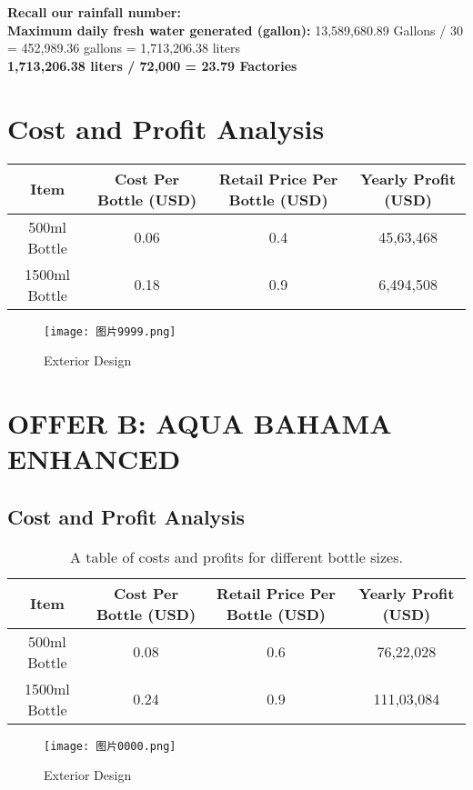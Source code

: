 \documentclass{article}
\begin{document}
\textbf{Recall our rainfall number:} \\
\textbf{Maximum daily fresh water generated (gallon):} 13,589,680.89 Gallons / 30 = 452,989.36 gallons = 1,713,206.38 liters \\
\textbf{1,713,206.38 liters / 72,000 = 23.79 Factories}

\section*{Cost and Profit Analysis}

\begin{table}[h]
\centering
\begin{tabular}{|c|c|c|c|}
\hline
\textbf{Item} & \textbf{Cost Per Bottle (USD)} & \textbf{Retail Price Per Bottle (USD)} & \textbf{Yearly Profit (USD)} \\
\hline
500ml Bottle & 0.06 & 0.4 & 45,63,468 \\
\hline
1500ml Bottle & 0.18 & 0.9 & 6,494,508 \\
\hline
\end{tabular}
\end{table}

\begin{figure}[H]
\centering
\texttt{[image: 图片9999.png]}
\caption{Exterior Design}
\end{figure}

\section{OFFER B: AQUA BAHAMA ENHANCED}
\subsection*{Cost and Profit Analysis}

\begin{table}[H]
\centering
\begin{tabular}{@{}cccc@{}}
\toprule
\textbf{Item} & \textbf{Cost Per Bottle (USD)} & \textbf{Retail Price Per Bottle (USD)} & \textbf{Yearly Profit (USD)} \\
\midrule
500ml Bottle & 0.08 & 0.6 & 76,22,028 \\
1500ml Bottle & 0.24 & 0.9 & 111,03,084 \\
\bottomrule
\end{tabular}
\caption{A table of costs and profits for different bottle sizes.}
\end{table}

\begin{figure}[H]
\centering
\texttt{[image: 图片0000.png]}
\caption{Exterior Design}
\end{figure}
\end{document}
